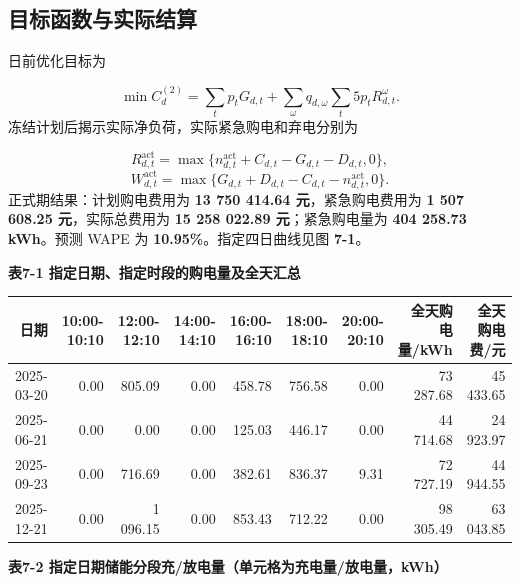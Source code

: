 \documentclass[12pt,a4paper]{ctexart}
\begin{document}
\subsection{目标函数与实际结算}
日前优化目标为\par
\begin{equation}
\min C^{(2)}_d=\sum_t p_tG_{d,t}
+\sum_{\omega}q_{d,\omega}\sum_t5p_tR^{\omega}_{d,t}.
\tag{11}
\end{equation}
冻结计划后揭示实际净负荷，实际紧急购电和弃电分别为\par
\begin{equation}
R^{\mathrm{act}}_{d,t}=\max\{n^{\mathrm{act}}_{d,t}+C_{d,t}-G_{d,t}-D_{d,t},0\},
\tag{12}
\end{equation}
\begin{equation}
W^{\mathrm{act}}_{d,t}=\max\{G_{d,t}+D_{d,t}-C_{d,t}-n^{\mathrm{act}}_{d,t},0\}.
\tag{13}
\end{equation}
正式期结果：计划购电费用为 \textbf{13 750 414.64 元}，紧急购电费用为 \textbf{1 507 608.25 元}，实际总费用为 \textbf{15 258 022.89 元}；紧急购电量为 \textbf{404 258.73 kWh}。预测 WAPE 为 \textbf{10.95\%}。指定四日曲线见图 \textbf{7-1}。\par
\textbf{表7-1 指定日期、指定时段的购电量及全天汇总}\par
\begin{table}[htbp]
\centering
\small
\begin{tabularx}{\textwidth}{@{}r r r r r r r r r@{}}
\toprule
日期 & 10:00-10:10 & 12:00-12:10 & 14:00-14:10 & 16:00-16:10 & 18:00-18:10 & 20:00-20:10 & 全天购电量/kWh & 全天购电费/元 \\
\midrule
2025-03-20 & 0.00 & 805.09 & 0.00 & 458.78 & 756.58 & 0.00 & 73 287.68 & 45 433.65 \\
2025-06-21 & 0.00 & 0.00 & 0.00 & 125.03 & 446.17 & 0.00 & 44 714.68 & 24 923.97 \\
2025-09-23 & 0.00 & 716.69 & 0.00 & 382.61 & 836.37 & 9.31 & 72 727.19 & 44 944.55 \\
2025-12-21 & 0.00 & 1 096.15 & 0.00 & 853.43 & 712.22 & 0.00 & 98 305.49 & 63 043.85 \\
\bottomrule
\end{tabularx}
\end{table}
\textbf{表7-2 指定日期储能分段充/放电量（单元格为充电量/放电量，kWh）}\par
\end{document}
